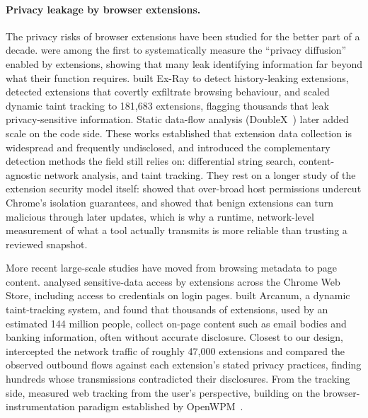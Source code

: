 \documentclass[sigconf,anonymous,review,balance=false]{acmart}
\begin{document}
\paragraph{Privacy leakage by browser extensions.}
The privacy risks of browser extensions have been studied for the better part of a decade.
\citet{starov2017extended} were among the first to systematically measure the ``privacy
diffusion'' enabled by extensions, showing that many leak identifying information far
beyond what their function requires. \citet{weissbacher2017exray} built Ex-Ray to detect
history-leaking extensions, \citet{aggarwal2018ispy} detected extensions that covertly
exfiltrate browsing behaviour, and \citet{chen2018mystique} scaled dynamic taint tracking
to 181{,}683 extensions, flagging thousands that leak privacy-sensitive information. Static
data-flow analysis (DoubleX~\cite{fass2021doublex}) later added scale on the code side.
These works established that extension data collection is widespread and frequently
undisclosed, and introduced the complementary detection methods the field still relies on:
differential string search, content-agnostic network analysis, and taint tracking. They
rest on a longer study of the extension security model itself:
\citet{carlini2012chrome} showed that over-broad host permissions undercut Chrome's
isolation guarantees, and \citet{pantelaios2020changed} showed that benign extensions can
turn malicious through later updates, which is why a runtime, network-level measurement of
what a tool actually transmits is more reliable than trusting a reviewed snapshot.

More recent large-scale studies have moved from browsing metadata to page content.
\citet{nayak2024experimental} analysed sensitive-data access by extensions across the
Chrome Web Store, including access to credentials on login pages. \citet{xie2024arcanum}
built Arcanum, a dynamic taint-tracking system, and found that thousands of extensions, used
by an estimated 144 million people, collect on-page content such as email bodies and
banking information, often without accurate disclosure. Closest to our design,
\citet{bui2023extpriva} intercepted the network traffic of roughly 47{,}000 extensions and
compared the observed outbound flows against each extension's stated privacy practices,
finding hundreds whose transmissions contradicted their disclosures. From the tracking
side, \citet{dambra2022sally} measured web tracking from the user's perspective, building on
the browser-instrumentation paradigm established by OpenWPM~\cite{englehardt2016openwpm}.
\end{document}
